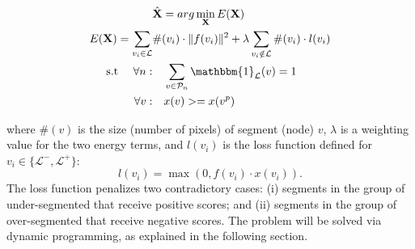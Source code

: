 

\begin{equation}
  \label{eq:energy}
  \begin{split}
    &\hat{\mathbf{X}} = arg\min_{\mathbf{X}} E(\mathbf{X})\\
 E(\mathbf{X}) =  \sum_{v_i \in \mathcal{L}} &\#(v_i) \cdot \|f(v_i)\|^2 + \lambda  \sum_{v_i \notin \mathcal{L}}  \#(v_i) \cdot l(v_i) \\
 \text{s.t   }  \quad \forall n: & \quad \sum_{v \in \mathcal{P}_n} \mathbbm{1}_\mathcal{L} (v) = 1\\
              \quad \forall v:  & \quad x(v) >= x(v^p)\\
   \end{split}
\end{equation}

where $\#(v)$ is the size (number of pixels) of segment (node) $v$, $\lambda$ is a
weighting value for the two energy terms, and $l(v_i)$ is the loss
function defined for $v_i \in \{ \mathcal{L}^-, \mathcal{L}^+ \}$:
\begin{equation}
  \label{eq:loss:fun}
  l(v_i) = \max(0, f(v_i)\cdot x(v_i)).
\end{equation}
The loss function penalizes two contradictory cases:
(i) segments in the group of under-segmented that receive positive scores; and
(ii) segments in the group of over-segmented that receive negative scores.
The problem will be solved via dynamic programming, as explained in the following section.

